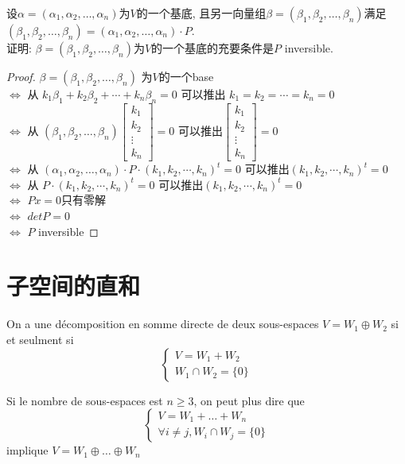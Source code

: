 \documentclass{book}
\begin{document}
\begin{question}
设$\alpha = (\alpha_1, \alpha_2, \ldots, \alpha_n)$为$V$的一个基底, 且另一向量组$\beta = (\beta_1, \beta_2, \ldots, \beta_n)$满足
$(\beta_1, \beta_2, \ldots, \beta_n) = (\alpha_1, \alpha_2, \ldots, \alpha_n) \cdot P$.\\
证明: $\beta = (\beta_1, \beta_2, \ldots, \beta_n)$为$V$的一个基底的充要条件是$P$ inversible.
\end{question}
\begin{proof}
$\beta = (\beta_1, \beta_2, \ldots, \beta_n)$ 为$V$的一个base \\
$\Leftrightarrow$ 从 $k_1 \beta_1 + k_2 \beta_2 + \cdots + k_n \beta_n = 0$ 可以推出 $k_1 = k_2 = \cdots = k_n = 0$ \\
$\Leftrightarrow$ 从 $(\beta_1, \beta_2, \ldots, \beta_n) \begin{bmatrix}k_1 \\ k_2 \\ \vdots \\ k_n\end{bmatrix} = 0$
	可以推出$\begin{bmatrix}k_1 \\ k_2 \\ \vdots \\ k_n\end{bmatrix} = 0$ \\
$\Leftrightarrow$ 从 $(\alpha_1, \alpha_2, \ldots, \alpha_n) \cdot P \cdot (k_1, k_2, \cdots, k_n)^t = 0$ 可以推出$(k_1, k_2, \cdots, k_n)^t = 0$ \\
$\Leftrightarrow$ 从 $P \cdot (k_1, k_2, \cdots, k_n)^t = 0$ 可以推出$(k_1, k_2, \cdots, k_n)^t = 0$  \\
$\Leftrightarrow$ $Px = 0$只有零解 \\
$\Leftrightarrow$ $detP = 0$ \\
$\Leftrightarrow$ $P$ inversible
\end{proof}

\section{子空间的直和}
\begin{theorem}
  On a une d\'ecomposition en somme directe de deux sous-espaces $ V = W_1 \oplus W_2$  si et seulment si
  $$
    \begin{cases}
    V=W_1+W_2 \\
    W_1\cap W_2=\{0\}
    \end{cases}
  $$
\end{theorem}
\begin{attention}
  Si le nombre de sous-espaces est $n\geqslant 3$, on peut plus dire que
  $$
    \begin{cases}
    V=W_1+\dots+W_n \\
    \forall i \neq j,W_i\cap W_j=\{0\}
    \end{cases}
  $$
  implique $ V = W_1 \oplus \dots \oplus W_n$
\end{attention}
\end{document}
